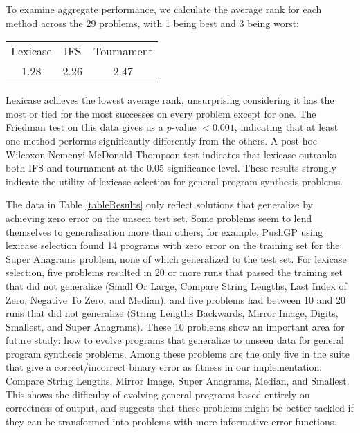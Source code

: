 \documentclass{sig-alternate}
\begin{document}
To examine aggregate performance, we calculate the average rank for each method across the 29 problems, with 1 being best and 3 being worst:
\begin{center}
\begin{tabular}{ccc}
\toprule
Lexicase & IFS & Tournament \\
1.28 & 2.26 & 2.47 \\
\bottomrule
\end{tabular}
\end{center}
Lexicase achieves the lowest average rank, unsurprising considering it has the most or tied for the most successes on every problem except for one. The Friedman test on this data gives us a \textit{p}-value $< 0.001$, indicating that at least one method performs significantly differently from the others. A post-hoc Wilcoxon-Nemenyi-McDonald-Thompson test \cite{hollander1999nonparametric} indicates that lexicase outranks both IFS and tournament at the $0.05$ significance level. These results strongly indicate the utility of lexicase selection for general program synthesis problems.

The data in Table \ref{tableResults} only reflect solutions that generalize by achieving zero error on the unseen test set. Some problems seem to lend themselves to generalization more than others; for example, PushGP using lexicase selection found 14 programs with zero error on the training set for the Super Anagrams problem, none of which generalized to the test set. For lexicase selection, five problems resulted in 20 or more runs that passed the training set that did not generalize (Small Or Large,
Compare String Lengths,
Last Index of Zero,
Negative To Zero, and
Median),
and five problems had between 10 and 20 runs that did not generalize (String Lengths Backwards,
Mirror Image,
Digits,
Smallest, and
Super Anagrams).
These 10 problems show an important area for future study: how to evolve programs that generalize to unseen data for general program synthesis problems. Among these problems are the only five in the suite that give a correct/incorrect binary error as fitness in our implementation: Compare String Lengths, Mirror Image, Super Anagrams, Median, and Smallest. This shows the difficulty of evolving general programs based entirely on correctness of output, and suggests that these problems might be better tackled if they can be transformed into problems with more informative error functions.

%
\end{document}
